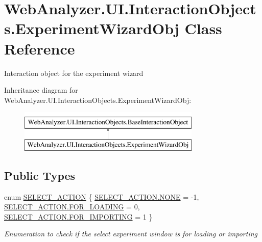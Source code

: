 \hypertarget{class_web_analyzer_1_1_u_i_1_1_interaction_objects_1_1_experiment_wizard_obj}{}\section{Web\+Analyzer.\+U\+I.\+Interaction\+Objects.\+Experiment\+Wizard\+Obj Class Reference}
\label{class_web_analyzer_1_1_u_i_1_1_interaction_objects_1_1_experiment_wizard_obj}


Interaction object for the experiment wizard  


Inheritance diagram for Web\+Analyzer.\+U\+I.\+Interaction\+Objects.\+Experiment\+Wizard\+Obj\+:\begin{figure}[H]
\begin{center}
\leavevmode
\includegraphics[height=2.000000cm]{class_web_analyzer_1_1_u_i_1_1_interaction_objects_1_1_experiment_wizard_obj}
\end{center}
\end{figure}
\subsection*{Public Types}
\begin{DoxyCompactItemize}
\item 
enum \hyperlink{class_web_analyzer_1_1_u_i_1_1_interaction_objects_1_1_experiment_wizard_obj_a8d68b0ff79197613c58d75f6323bb6ba}{S\+E\+L\+E\+C\+T\+\_\+\+A\+C\+T\+I\+O\+N} \{ \hyperlink{class_web_analyzer_1_1_u_i_1_1_interaction_objects_1_1_experiment_wizard_obj_a8d68b0ff79197613c58d75f6323bb6baab50339a10e1de285ac99d4c3990b8693}{S\+E\+L\+E\+C\+T\+\_\+\+A\+C\+T\+I\+O\+N.\+N\+O\+N\+E} = -\/1, 
\hyperlink{class_web_analyzer_1_1_u_i_1_1_interaction_objects_1_1_experiment_wizard_obj_a8d68b0ff79197613c58d75f6323bb6baa047c0adfe72f2a351a143b7b46b0519b}{S\+E\+L\+E\+C\+T\+\_\+\+A\+C\+T\+I\+O\+N.\+F\+O\+R\+\_\+\+L\+O\+A\+D\+I\+N\+G} = 0, 
\hyperlink{class_web_analyzer_1_1_u_i_1_1_interaction_objects_1_1_experiment_wizard_obj_a8d68b0ff79197613c58d75f6323bb6baa05c8a6868499ead96ace0a258e3fb238}{S\+E\+L\+E\+C\+T\+\_\+\+A\+C\+T\+I\+O\+N.\+F\+O\+R\+\_\+\+I\+M\+P\+O\+R\+T\+I\+N\+G} = 1
 \}\begin{DoxyCompactList}\small\item\em Enumeration to check if the select experiment window is for loading or importing \end{DoxyCompactList}
\end{DoxyCompactItemize}
